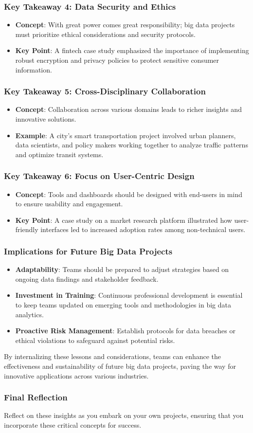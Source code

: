 \documentclass[aspectratio=169]{beamer}
\begin{document}
\begin{frame}[fragile]
    \frametitle{Key Takeaway 4: Data Security and Ethics}
    \begin{itemize}
        \item \textbf{Concept}: With great power comes great responsibility; big data projects must prioritize ethical considerations and security protocols.
        \item \textbf{Key Point}: A fintech case study emphasized the importance of implementing robust encryption and privacy policies to protect sensitive consumer information.
    \end{itemize}
\end{frame}

\begin{frame}[fragile]
    \frametitle{Key Takeaway 5: Cross-Disciplinary Collaboration}
    \begin{itemize}
        \item \textbf{Concept}: Collaboration across various domains leads to richer insights and innovative solutions.
        \item \textbf{Example}: A city’s smart transportation project involved urban planners, data scientists, and policy makers working together to analyze traffic patterns and optimize transit systems.
    \end{itemize}
\end{frame}

\begin{frame}[fragile]
    \frametitle{Key Takeaway 6: Focus on User-Centric Design}
    \begin{itemize}
        \item \textbf{Concept}: Tools and dashboards should be designed with end-users in mind to ensure usability and engagement.
        \item \textbf{Key Point}: A case study on a market research platform illustrated how user-friendly interfaces led to increased adoption rates among non-technical users.
    \end{itemize}
\end{frame}

\begin{frame}[fragile]
    \frametitle{Implications for Future Big Data Projects}
    \begin{itemize}
        \item \textbf{Adaptability}: Teams should be prepared to adjust strategies based on ongoing data findings and stakeholder feedback.
        \item \textbf{Investment in Training}: Continuous professional development is essential to keep teams updated on emerging tools and methodologies in big data analytics.
        \item \textbf{Proactive Risk Management}: Establish protocols for data breaches or ethical violations to safeguard against potential risks.
    \end{itemize}
    By internalizing these lessons and considerations, teams can enhance the effectiveness and sustainability of future big data projects, paving the way for innovative applications across various industries.
\end{frame}

\begin{frame}[fragile]
    \frametitle{Final Reflection}
    Reflect on these insights as you embark on your own projects, ensuring that you incorporate these critical concepts for success.
\end{frame}
\end{document}
